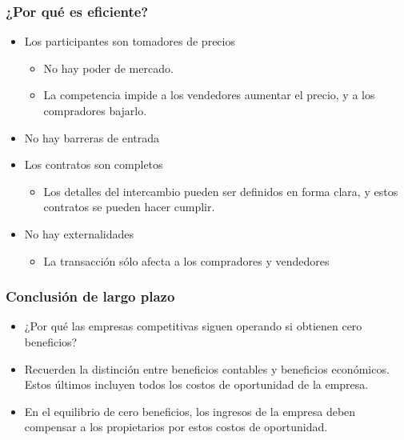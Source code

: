 \documentclass{beamer}
\begin{document}
\begin{frame}
\frametitle{¿Por qué es eficiente?}
\begin{itemize}
    \item Los participantes son tomadores de precios
    \begin{itemize}
        \item No hay poder de mercado.
        \item La competencia impide a los vendedores aumentar el precio, y a los compradores bajarlo.
    \end{itemize}
    \item No hay barreras de entrada
    \item Los contratos son completos
        \begin{itemize}
        \item Los detalles del intercambio pueden ser definidos en forma clara, y estos contratos se pueden hacer cumplir.
        \end{itemize}
    \item No hay externalidades
        \begin{itemize}
        \item La transacción sólo afecta a los compradores y vendedores
        \end{itemize}
\end{itemize}
\end{frame}

\begin{frame}
\frametitle{Conclusión de largo plazo}

\begin{itemize}
\item ¿Por qué las empresas competitivas siguen operando si obtienen cero beneficios?
\item Recuerden la distinción entre beneficios contables y beneficios económicos. Estos últimos incluyen todos los costos de oportunidad de la empresa.
\item En el equilibrio de cero beneficios, los ingresos de la empresa deben compensar a los propietarios por estos costos de oportunidad.

\end{itemize}
\end{frame}
\end{document}
